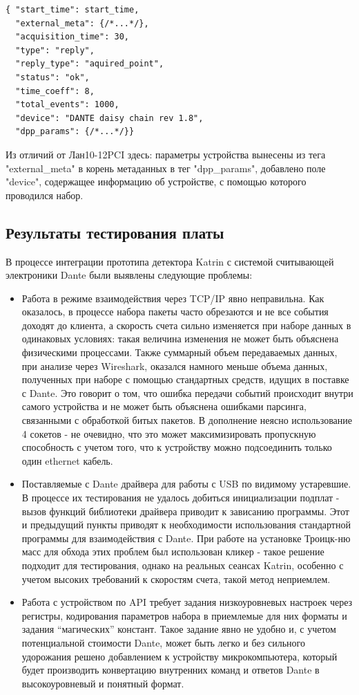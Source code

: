 \documentclass[a4paper,14pt]{extreport}
\begin{document}
\begin{lstlisting}[caption={Метаданные пакета с набранными Dante событиями.}, captionpos=b]
{ "start_time": start_time,
  "external_meta": {/*...*/},
  "acquisition_time": 30,
  "type": "reply",
  "reply_type": "aquired_point",
  "status": "ok",
  "time_coeff": 8,
  "total_events": 1000,
  "device": "DANTE daisy chain rev 1.8",
  "dpp_params": {/*...*/}}
\end{lstlisting}

Из отличий от Лан10-12PCI здесь: параметры устройства вынесены из тега "external\_meta" в корень метаданных в тег "dpp\_params", добавлено поле "device", содержащее информацию об устройстве, с помощью которого проводился набор.

\subsection{Результаты тестирования платы}

В процессе интеграции прототипа детектора Katrin с системой считывающей электроники Dante были выявлены следующие проблемы:
\begin{itemize}
    \item Работа в режиме взаимодействия через TCP/IP явно неправильна. Как оказалось, в процессе набора пакеты часто обрезаются и не все события доходят до клиента, а скорость счета сильно изменяется при наборе данных в одинаковых условиях: такая величина изменения не может быть объяснена физическими процессами. Также суммарный объем передаваемых данных, при анализе через Wireshark, оказался намного меньше объема данных, полученных при наборе с помощью стандартных средств, идущих в поставке с Dante. Это говорит о том, что ошибка передачи событий происходит внутри самого устройства и не может быть объяснена ошибками парсинга, связанными с обработкой битых пакетов. В дополнение неясно использование 4 сокетов - не очевидно, что это может максимизировать пропускную способность с учетом того, что к устройству можно подсоединить только один ethernet кабель. 
    \item Поставляемые с Dante драйвера для работы с USB по видимому устаревшие. В процессе их тестирования не удалось добиться инициализации подплат - вызов функций библиотеки драйвера приводит к зависанию программы. Этот и предыдущий пункты приводят к необходимости использования стандартной программы для взаимодействия с Dante. При работе на установке Троицк-ню масс для обхода этих проблем был использован кликер - такое решение подходит для тестирования, однако на реальных сеансах Katrin, особенно с учетом высоких требований к скоростям счета, такой метод неприемлем.
    \item Работа с устройством по API требует задания низкоуровневых настроек через регистры, кодирования параметров набора в приемлемые для них форматы и задания “магических” констант. Такое задание явно не удобно и, с учетом потенциальной стоимости Dante, может быть легко и без сильного удорожания решено добавлением к устройству микрокомпьютера, который будет производить конвертацию внутренних команд и ответов Dante в высокоуровневый и понятный формат.
\end{itemize}
\end{document}
